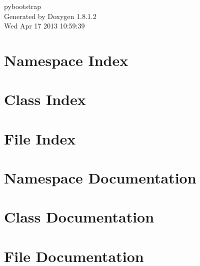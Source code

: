 \documentclass{book}
\begin{document}
\hypersetup{pageanchor=false,citecolor=blue}
\begin{titlepage}
\vspace*{7cm}
\begin{center}
{\Large pybootstrap }\\
\vspace*{1cm}
{\large Generated by Doxygen 1.8.1.2}\\
\vspace*{0.5cm}
{\small Wed Apr 17 2013 10:59:39}\\
\end{center}
\end{titlepage}
\clearemptydoublepage
{}
\tableofcontents
\clearemptydoublepage
{}
\hypersetup{pageanchor=true,citecolor=blue}
\chapter{Namespace Index}

\chapter{Class Index}

\chapter{File Index}

\chapter{Namespace Documentation}







\chapter{Class Documentation}











\chapter{File Documentation}







\printindex
\end{document}

